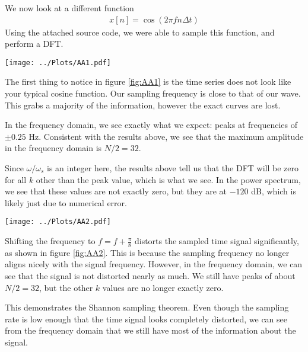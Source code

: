 \documentclass[twocolumn]{myarticle}
\begin{document}
We now look at a different function 
\begin{align}
    x[n] = \cos\left(2\pi f n\Delta t\right)
\end{align}
Using the attached source code, we were able to sample this function, and perform a DFT.

\begin{figure*}[htpb]
    \centering
    \texttt{[image: ../Plots/AA1.pdf]}
    \caption{%
        DFT of $x[n]=\cos(2\pi fn\Delta t)$. Top figure showing the sampled time series, the middle showing the DFT, and the bottom displaying the power in dB.
    }
    \label{fig:AA1}
\end{figure*}

The first thing to notice in figure \ref{fig:AA1} is the time series does not look like your typical cosine function. 
Our sampling frequency is close to that of our wave. 
This grabs a majority of the information, however the exact curves are lost. 

In the frequency domain, we see exactly what we expect: peaks at frequencies of $ \pm 0.25 $ Hz. 
Consistent with the results above, we see that the maximum amplitude in the frequency domain is $ N/2 = 32 $.

Since $ \omega/\omega_s $ is an integer here, the results above tell us that the DFT will be zero for all $ k $ other than the peak value, which is what we see.
In the power spectrum, we see that these values are not exactly zero, but they are at $ -120 $ dB, which is likely just due to numerical error.

\begin{figure*}[htpb]
    \centering
    \texttt{[image: ../Plots/AA2.pdf]}
    \caption{%
        DFT of the modified cosine of $x[n]=\cos(2\pi (f+\pi/8) n\Delta t)$. Top figure showing the sampled time series, the middle showing the DFT, and the bottom displaying the power in dB.
    }
    \label{fig:AA2}
\end{figure*}
Shifting the frequency to $f=f+\frac{\pi}{8}$ distorts the sampled time signal significantly, as shown in figure \ref{fig:AA2}. 
This is because the sampling frequency no longer aligns nicely with the signal frequency.
However, in the frequency domain, we can see that the signal is not distorted nearly as much.
We still have peaks of about $ N/2 = 32 $, but the other $ k $ values are no longer exactly zero.

This demonstrates the Shannon sampling theorem.
Even though the sampling rate is low enough that the time signal looks completely distorted, we can see from the frequency domain that we still have most of the information about the signal.
\end{document}
